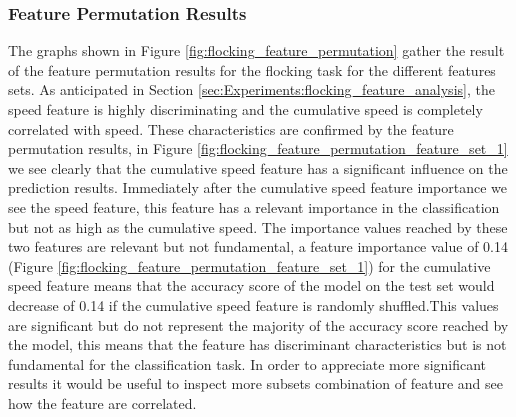 \documentclass[../../Thesis.tex]{subfiles}
\begin{document}
			\subsubsection{Feature Permutation Results}
				The graphs shown in Figure \ref{fig:flocking_feature_permutation} gather the result of the feature permutation results for the flocking task for the different features sets. As anticipated in Section \ref{sec:Experiments:flocking_feature_analysis},  the speed feature is highly discriminating and the cumulative speed is completely correlated with speed. These characteristics are confirmed by the feature permutation results, in Figure \ref{fig:flocking_feature_permutation_feature_set_1} we see clearly that the cumulative speed feature has a significant influence on the prediction results. Immediately after the cumulative speed feature importance we see the speed feature, this feature has a relevant importance in the classification but not as high as the cumulative speed. The importance values reached by these two features are relevant but not fundamental, a feature importance value of 0.14 (Figure \ref{fig:flocking_feature_permutation_feature_set_1}) for the cumulative speed feature means that the accuracy score of the model on the test set would decrease of 0.14 if the cumulative speed feature is randomly shuffled.This values are significant but do not represent the majority of the accuracy score reached by the model, this means that the feature has discriminant characteristics but is not fundamental for the classification task. In order to appreciate more significant results it would be useful to inspect more subsets combination of feature and see how the feature are correlated.
\end{document}
